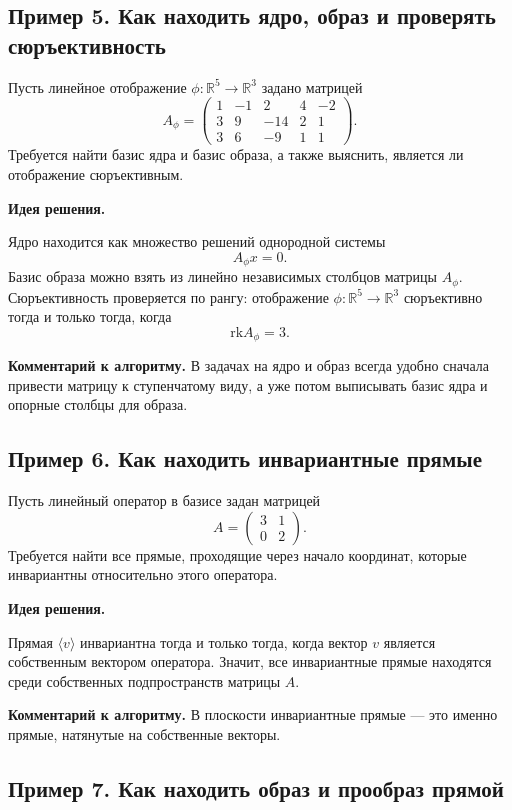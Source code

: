 \subsection*{Пример 5. Как находить ядро, образ и проверять сюръективность}

Пусть линейное отображение $\phi:\mathbb{R}^5\to\mathbb{R}^3$ задано матрицей
\[
A_\phi=
\begin{pmatrix}
1 & -1 & 2 & 4 & -2\\
3 & 9 & -14 & 2 & 1\\
3 & 6 & -9 & 1 & 1
\end{pmatrix}.
\]
Требуется найти базис ядра и базис образа, а также выяснить, является ли отображение сюръективным.

\textbf{Идея решения.}

Ядро находится как множество решений однородной системы
\[
A_\phi x=0.
\]
Базис образа можно взять из линейно независимых столбцов матрицы $A_\phi$.  
Сюръективность проверяется по рангу: отображение $\phi:\mathbb{R}^5\to\mathbb{R}^3$ сюръективно тогда и только тогда, когда
\[
\mathrm{rk} A_\phi=3.
\]

\medskip
\noindent
\textbf{Комментарий к алгоритму.}
В задачах на ядро и образ всегда удобно сначала привести матрицу к ступенчатому виду, а уже потом выписывать базис ядра и опорные столбцы для образа.

\subsection*{Пример 6. Как находить инвариантные прямые}

Пусть линейный оператор в базисе задан матрицей
\[
A=\begin{pmatrix}
3 & 1\\
0 & 2
\end{pmatrix}.
\]
Требуется найти все прямые, проходящие через начало координат, которые инвариантны относительно этого оператора.

\textbf{Идея решения.}

Прямая $\langle v\rangle$ инвариантна тогда и только тогда, когда вектор $v$ является собственным вектором оператора.  
Значит, все инвариантные прямые находятся среди собственных подпространств матрицы $A$.

\medskip
\noindent
\textbf{Комментарий к алгоритму.}
В плоскости инвариантные прямые --- это именно прямые, натянутые на собственные векторы.

\subsection*{Пример 7. Как находить образ и прообраз прямой}

